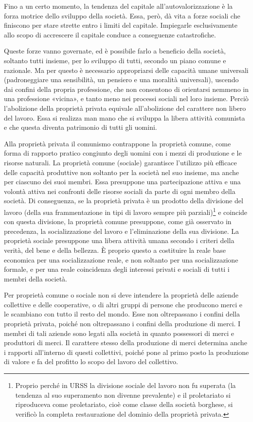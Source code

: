 \documentclass[12pt,a4paper,openany]{book}
\begin{document}
Fino a un certo momento, la tendenza del capitale all'autovalorizzazione è la forza motrice dello sviluppo della società. Essa, però, dà vita a forze sociali che finiscono per stare strette entro i limiti del capitale. Impiegarle esclusivamente allo scopo di accrescere il capitale conduce a conseguenze catastrofiche.

Queste forze vanno governate, ed è possibile farlo a beneficio della società, soltanto tutti insieme, per lo sviluppo di tutti, secondo un piano comune e razionale. Ma per questo è necessario appropriarsi delle capacità umane universali (padroneggiare una sensibilità, un pensiero e una moralità universali), uscendo dai confini della propria professione, che non consentono di orientarsi nemmeno in una professione «vicina», e tanto meno nei processi sociali nel loro insieme. Perciò l'abolizione della proprietà privata equivale all'abolizione del carattere non libero del lavoro. Essa si realizza man mano che si sviluppa la libera attività comunista e che questa diventa patrimonio di tutti gli uomini.

Alla proprietà privata il comunismo contrappone la proprietà comune, come forma di rapporto pratico congiunto degli uomini con i mezzi di produzione e le risorse naturali. La proprietà comune (sociale) garantisce l'utilizzo più efficace delle capacità produttive non soltanto per la società nel suo insieme, ma anche per ciascuno dei suoi membri. Essa presuppone una partecipazione attiva e una volontà attiva nei confronti delle risorse sociali da parte di ogni membro della società. Di conseguenza, se la proprietà privata è un prodotto della divisione del lavoro (della sua frammentazione in tipi di lavoro sempre più parziali)\footnote{Proprio perché in URSS la divisione sociale del lavoro non fu superata (la tendenza al suo superamento non divenne prevalente) e il proletariato si riproduceva come proletariato, cioè come classe della società borghese, si verificò la completa restaurazione del dominio della proprietà privata.} e coincide con questa divisione, la proprietà comune presuppone, come già osservato in precedenza, la socializzazione del lavoro e l'eliminazione della sua divisione. La proprietà sociale presuppone una libera attività umana secondo i criteri della verità, del bene e della bellezza. È proprio questo a costituire la reale base economica per una socializzazione reale, e non soltanto per una socializzazione formale, e per una reale coincidenza degli interessi privati e sociali di tutti i membri della società.

Per proprietà comune o sociale non si deve intendere la proprietà delle aziende collettive e delle cooperative, o di altri gruppi di persone che producono merci e le scambiano con tutto il resto del mondo. Esse non oltrepassano i confini della proprietà privata, poiché non oltrepassano i confini della produzione di merci. I membri di tali aziende sono legati alla società in quanto possessori di merci e produttori di merci. Il carattere stesso della produzione di merci determina anche i rapporti all'interno di questi collettivi, poiché pone al primo posto la produzione di valore e fa del profitto lo scopo del lavoro del collettivo.
\end{document}
